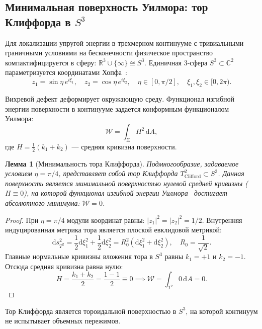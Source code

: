 \documentclass[11pt,a4paper]{article}
\newtheorem{lemma}[theorem]{Лемма}
\theoremstyle{definition}
\theoremstyle{remark}
\begin{document}
\subsection{Минимальная поверхность Уилмора: тор Клиффорда в $S^3$}
	
Для локализации упругой энергии в трехмерном континууме с тривиальными граничными условиями на бесконечности физическое пространство компактифицируется в сферу: $\mathbb{R}^3 \cup \{\infty\} \cong S^3$. Единичная 3-сфера $S^3 \subset \mathbb{C}^2$ параметризуется координатами Хопфа~\cite{Hopf1931}:
\begin{equation}
	z_1 = \sin\eta \, e^{i\xi_1}, \quad z_2 = \cos\eta \, e^{i\xi_2}, \quad \eta \in [0, \pi/2], \quad \xi_1, \xi_2 \in [0, 2\pi).
	\label{eq:hopf_coordinates_def}
\end{equation}
	
Вихревой дефект деформирует окружающую среду. Функционал изгибной энергии поверхности в континууме задается конформным функционалом Уилмора:
\begin{equation}
	\mathcal{W} = \int_{\Sigma} H^2 \, \mathrm{d}A,
	\label{eq:willmore_functional_def}
\end{equation}
	где $H = \frac{1}{2}(k_1 + k_2)$ — средняя кривизна поверхности.
	
\begin{lemma}[Минимальность тора Клиффорда]
\label{lem:clifford_minimal_surface}
Подмногообразие, задаваемое условием $\eta = \pi/4$, представляет собой тор Клиффорда $T^2_{\mathrm{Clifford}} \subset S^3$. Данная поверхность является минимальной поверхностью нулевой средней кривизны ($H \equiv 0$), на которой функционал изгибной энергии Уилмора~\cite{Willmore1965} достигает абсолютного минимума: $\mathcal{W} = 0$.
\end{lemma}
	
\begin{proof}
При $\eta = \pi/4$ модули координат равны: $|z_1|^2 = |z_2|^2 = 1/2$. Внутренняя индуцированная метрика тора является плоской евклидовой метрикой:
\begin{equation}
	\mathrm{d}s^2_{T^2} = \frac{1}{2}\mathrm{d}\xi_1^2 + \frac{1}{2}\mathrm{d}\xi_2^2 = R_0^2 (\mathrm{d}\xi_1^2 + \mathrm{d}\xi_2^2), \quad R_0 = \frac{1}{\sqrt{2}}.
	\label{eq:clifford_flat_metric}
\end{equation}
Главные нормальные кривизны вложения тора в $S^3$ равны $k_1 = +1$ и $k_2 = -1$. Отсюда средняя кривизна равна нулю:
\begin{equation}
	H = \frac{k_1 + k_2}{2} = \frac{1 - 1}{2} \equiv 0 \implies \mathcal{W} = \int_{T^2} 0 \, \mathrm{d}A = 0.
	\label{eq:clifford_zero_mean_curvature}
\end{equation}
\end{proof}
Тор Клиффорда является тороидальной поверхностью в $S^3$, на которой континуум не испытывает объемных пережимов.
	
\end{document}
